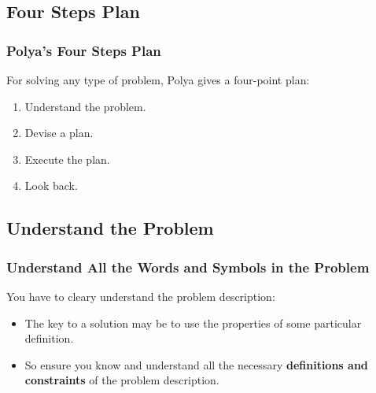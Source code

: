 \documentclass{beamer}
\begin{document}
\subsection{Four Steps Plan}

\begin{frame}%
\frametitle{Polya's Four Steps Plan}

For solving any type
of problem, Polya gives a four-point plan:
\vspace{0.2cm}
\begin{enumerate}

\item<1-> Understand the problem.
\vspace{0.35cm}

\item<2-> Devise a plan.
\vspace{0.35cm}

\item<3-> Execute the plan.
\vspace{0.35cm}

\item<4-> Look back.

\end{enumerate}

\end{frame}

\subsection{Understand the Problem}

\begin{frame}%
\frametitle{Understand All the Words and Symbols in the Problem}




You have to cleary understand the problem description:\\
\vspace{0.1cm}
\begin{itemize}
\item<1-> The key to a solution may be to use the properties
of some particular definition.\\
\vspace{0.2cm}
\item<2-> So ensure you know and understand all the necessary \textbf{definitions and constraints} of the problem description.\\
\end{itemize}


\end{frame}
\end{document}
